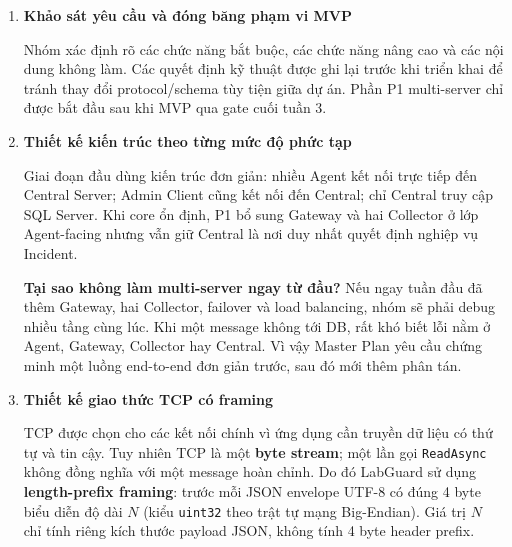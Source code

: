 
\begin{enumerate}
    \item \textbf{Khảo sát yêu cầu và đóng băng phạm vi MVP}

    Nhóm xác định rõ các chức năng bắt buộc, các chức năng nâng cao và các nội dung không làm. Các quyết định kỹ thuật được ghi lại trước khi triển khai để tránh thay đổi protocol/schema tùy tiện giữa dự án. Phần P1 multi-server chỉ được bắt đầu sau khi MVP qua gate cuối tuần 3.

    \item \textbf{Thiết kế kiến trúc theo từng mức độ phức tạp}

    Giai đoạn đầu dùng kiến trúc đơn giản: nhiều Agent kết nối trực tiếp đến Central Server; Admin Client cũng kết nối đến Central; chỉ Central truy cập SQL Server. Khi core ổn định, P1 bổ sung Gateway và hai Collector ở lớp Agent-facing nhưng vẫn giữ Central là nơi duy nhất quyết định nghiệp vụ Incident.

    \begin{beginnerbox}
    \textbf{Tại sao không làm multi-server ngay từ đầu?} Nếu ngay tuần đầu đã thêm Gateway, hai Collector, failover và load balancing, nhóm sẽ phải debug nhiều tầng cùng lúc. Khi một message không tới DB, rất khó biết lỗi nằm ở Agent, Gateway, Collector hay Central. Vì vậy Master Plan yêu cầu chứng minh một luồng end-to-end đơn giản trước, sau đó mới thêm phân tán.
    \end{beginnerbox}

    \item \textbf{Thiết kế giao thức TCP có framing}

    TCP \cite{rfc9293} được chọn cho các kết nối chính vì ứng dụng cần truyền dữ liệu có thứ tự và tin cậy. Tuy nhiên TCP là một \textbf{byte stream}; một lần gọi \texttt{ReadAsync} không đồng nghĩa với một message hoàn chỉnh. Do đó LabGuard sử dụng \textbf{length-prefix framing}: trước mỗi JSON envelope UTF-8 có đúng 4 byte biểu diễn độ dài $N$ (kiểu \texttt{uint32} theo trật tự mạng Big-Endian). Giá trị $N$ chỉ tính riêng kích thước payload JSON, không tính 4 byte header prefix.


\end{enumerate}
